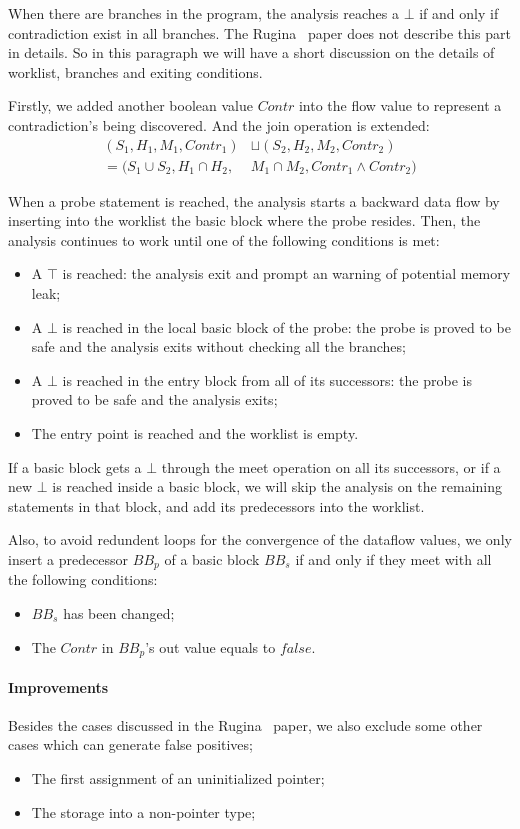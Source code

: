 When there are branches in the program, the analysis reaches a $\bot$ if and only 
if contradiction exist in all branches. The Rugina~\cite{rugina} paper does not 
describe this part in details. So in this paragraph we will have a 
short discussion on the details of worklist, branches and exiting conditions.

Firstly, we added another boolean value $Contr$ into the flow value to 
represent a contradiction's being discovered. And the join operation is 
extended:
\begin{align*}
  (S_1,H_1,M_1,Contr_1) &\sqcup (S_2,H_2,M_2,Contr_2) \\
  = (S_1\cup S_2,H_1\cap H_2, & M_1\cap M_2,Contr_1\wedge Contr_2)
\end{align*}

When a probe statement is reached, the analysis starts a backward data flow 
by inserting into the worklist the basic block where 
the probe resides. Then, the analysis continues to work until one of the 
following conditions is met:
\begin{itemize}
  \item A $\top$ is reached: the analysis exit and prompt an warning of 
    potential memory leak;
  \item A $\bot$ is reached in the local basic block of the probe: 
    the probe is proved to be safe and the analysis exits without checking all 
    the branches;
  \item A $\bot$ is reached in the entry block from all of its successors:
    the probe is proved to be safe and the analysis exits;
  \item The entry point is reached and the worklist is empty.
\end{itemize}

If a basic block gets a $\bot$ through the meet operation on all its successors,
or if a new $\bot$ is reached inside a basic block, we will skip the analysis on 
the remaining statements in that block, and add its predecessors into the 
worklist.

Also, to avoid redundent loops for the convergence of the dataflow values, 
we only insert a predecessor $BB_p$ of a basic block $BB_s$ if and only if they 
meet with all the following conditions:
\begin{itemize}
  \item $BB_s$ has been changed;
  \item The $Contr$ in $BB_p$'s out value equals to $false$.
\end{itemize}


\paragraph{Improvements}

Besides the cases discussed in the Rugina~\cite{rugina} paper, we also exclude 
some other cases which can generate false positives;

\begin{itemize}
  \item The first assignment of an uninitialized pointer;
  \item The storage into a non-pointer type;
\end{itemize}
